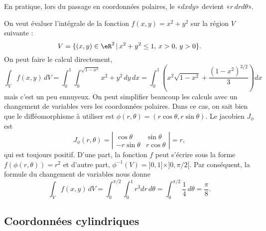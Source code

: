En pratique, lors du passage en coordonnées polaires, le «\( dxdy\)» devient «\( r\,drd\theta\)».

\begin{example}
	On veut évaluer l'intégrale de la fonction \( f(x,y)= x^2+y^2\) sur la région \( V\) suivante :
	\[
		V=\{(x,y) \in \eR^2\,\vert\, x^2+y^2\leq 1,\, x>0,\, y>0\}.
	\]
	On peut faire le calcul directement,
	\[
		\int_{V}f(x,y)\, dV=\int_0^1\int_0^{\sqrt{1-x^2}}x^2+y^2\, dy\,dx=\int_0^1\left(x^2\sqrt{1-x^2} + \frac{(1-x^2)^{3/2}}{3}\right) dx
	\]
	mais c'est un peu ennuyeux. On peut simplifier beaucoup les calculs avec un changement de variables vers les coordonnées polaires. Dans ce cas, on sait bien que le difféomorphisme à utiliser est \( \phi(r,\theta)=(r\cos \theta, r\sin\theta)\). Le jacobien  \( J_{\phi}\) est
	\begin{equation}
		J_{\phi}(r, \theta)= \left\vert\begin{array}{cc}
			\cos \theta   & \sin \theta  \\
			-r\sin \theta & r\cos \theta
		\end{array}\right\vert= r,
	\end{equation}
	qui est toujours positif. D'une part, la fonction \( f\) peut s'écrire sous la forme \( f(\phi(r,\theta))=r^2\) et d'autre part, \( \phi^{-1}(V)=]0,1]\times]0, \pi/2[\). Par conséquent, la formule du changement de variables nous donne
	\[
		\int_{V}f(x,y)\, dV=\int_0^{\pi/2}\int_0^{1}r^3 dr\,d\theta=\int_0^{\pi/2}\frac{1}{4}\,d\theta=\frac{\pi}{8}.
	\]
\end{example}

\subsection{Coordonnées cylindriques}

